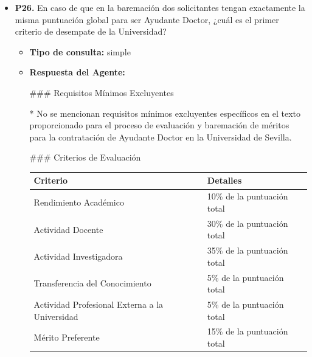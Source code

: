 \documentclass{article}
\begin{document}
\begin{itemize}
\begin{itemize}
\begin{scriptsize}
                  Revisión 3 (diciembre, 2024) 29
                \end{scriptsize}
        \end{itemize}


  \item \textbf{P26.} En caso de que en la baremación dos solicitantes tengan exactamente la misma puntuación global para ser Ayudante Doctor, ¿cuál es el primer criterio de desempate de la Universidad? \\
        \begin{itemize}
          \item \textbf{Tipo de consulta:} simple
          \item \textbf{Respuesta del Agente:}

                \#\#\# Requisitos Mínimos Excluyentes

                *   No se mencionan requisitos mínimos excluyentes específicos en el texto proporcionado para el proceso de evaluación y baremación de méritos para la contratación de Ayudante Doctor en la Universidad de Sevilla.

                \#\#\# Criterios de Evaluación

                \vspace{0.4cm}
                \begin{table}[h!]\centering\renewcommand{\arraystretch}{1.3}
                  \begin{tabular}{|p{}|p{}|}\hline
                    Criterio                                       & Detalles                    \\\hline
                    Rendimiento Académico                          & 10\% de la puntuación total \\\hline
                    Actividad Docente                              & 30\% de la puntuación total \\\hline
                    Actividad Investigadora                        & 35\% de la puntuación total \\\hline
                    Transferencia del Conocimiento                 & 5\% de la puntuación total  \\\hline
                    Actividad Profesional Externa a la Universidad & 5\% de la puntuación total  \\\hline
                    Mérito Preferente                              & 15\% de la puntuación total \\\hline
                  \end{tabular}\end{table}
                \vspace{0.4cm}


\end{itemize}
\end{itemize}
\end{document}
